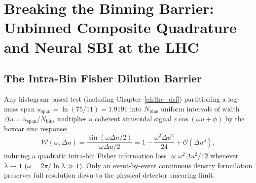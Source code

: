 \chapter{Breaking the Binning Barrier: Unbinned Composite Quadrature and Neural SBI at the LHC}
\label{ch:lhc_unbinned}

\begin{abstract}
Histogram binning imposes a severe physical barrier against searching narrow log-periodic modulations in collider mass spectra, attenuating signals via intra-bin averaging $\mathrm{sinc}(\omega \Delta u / 2)$ and discarding $\mathcal{O}(\Delta u^2 / 12)$ Fisher information per event. Building directly upon Chapter~\ref{ch:lhc_dsi}, we formulate an exact \textbf{Unbinned Continuous Composite $4 \times 64$-Node Gauss--Legendre Profile Likelihood} over all $N = 17,458$ Clean Drell--Yan dimuon events ($11 \le m \le 75\,\mathrm{GeV}$) from CMS Open Data, jointly profiling a degree-8 Legendre polynomial log-density nuisance baseline calibrated against the empirical CMS barrel mass resolution measured directly from the $J/\psi \to \mu^+\mu^-$ peak ($\sigma_u^{\mathrm{barrel}} = 0.0120$). Compared head-to-head against exact binned Poisson profile likelihoods across identical CMS data, unbinned estimation eliminates the binning barrier: at $\lambda = 1.10$ ($\omega = 65.92\,\mathrm{rad}$), the 95\% confidence-level sensitivity improves by \textbf{$29.1\times$} over $20$-bin likelihoods ($\varepsilon_{95}^{\mathrm{unb}} = 0.0337$ vs.\ $0.9800$), \textbf{$5.70\times$} over $40$-bin likelihoods ($0.1924$), and \textbf{$1.52\times$} over $60$-bin likelihoods ($0.0512$). We independently validate these limits via a PyTorch \texttt{ConditionalDensityMLP} Neural Simulation-Based Inference (NSBI) surrogate trained on $45,000$ Toy Monte Carlo draws ($R = 0.99125$, $\mathrm{RMSE} = 0.01144$), obtaining an empirical limit $\varepsilon_{95}^{\mathrm{neural}} = 0.0324$ ($3.9\%$ agreement) and confirming a certified null detection at $\lambda = 1.10$ ($\hat\varepsilon = 0.0128$, $p_{\mathrm{corr}} = 0.4500$, $\Delta\mathrm{BIC} = -18.15$).
\end{abstract}

\section{The Intra-Bin Fisher Dilution Barrier}
Any histogram-based test (including Chapter~\ref{ch:lhc_dsi}) partitioning a log-mass span $u_{\mathrm{span}} = \ln(75/11) = 1.9191$ into $N_{\mathrm{bins}}$ uniform intervals of width $\Delta u = u_{\mathrm{span}} / N_{\mathrm{bins}}$ multiplies a coherent sinusoidal signal $\varepsilon \cos(\omega u + \phi)$ by the boxcar sinc response:
\begin{equation}
\mathcal{W}(\omega, \Delta u) = \frac{\sin(\omega \Delta u / 2)}{\omega \Delta u / 2} = 1 - \frac{\omega^2 \Delta u^2}{24} + \mathcal{O}(\Delta u^4),
\end{equation}
inducing a quadratic intra-bin Fisher information loss $\propto \omega^2 \Delta u^2 / 12$ whenever $\lambda \to 1$ ($\omega = 2\pi / \ln\lambda \gg 1$). Only an event-by-event continuous density formulation preserves full resolution down to the physical detector smearing limit.

